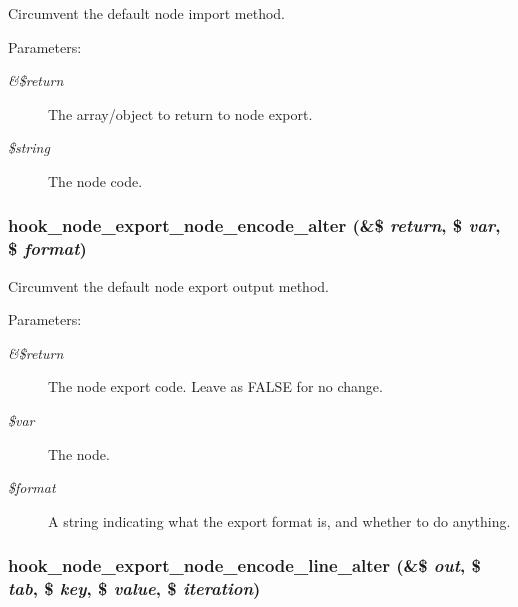 Circumvent the default node import method.

\begin{Desc}
\item[Parameters:]
\begin{description}
\item[{\em \&\$return}]The array/object to return to node export. \item[{\em \$string}]The node code. \end{description}
\end{Desc}
\hypertarget{node__export_8api_8php_aa3a7ad2886990335945a261e9d38793}{
\subsubsection[{hook\_\-node\_\-export\_\-node\_\-encode\_\-alter}]{\setlength{\rightskip}{0pt plus 5cm}hook\_\-node\_\-export\_\-node\_\-encode\_\-alter (\&\$ {\em return}, \/  \$ {\em var}, \/  \$ {\em format})}}
\label{node__export_8api_8php_aa3a7ad2886990335945a261e9d38793}


Circumvent the default node export output method.

\begin{Desc}
\item[Parameters:]
\begin{description}
\item[{\em \&\$return}]The node export code. Leave as FALSE for no change. \item[{\em \$var}]The node. \item[{\em \$format}]A string indicating what the export format is, and whether to do anything. \end{description}
\end{Desc}
\hypertarget{node__export_8api_8php_358549eb1b3bc10229c889721c180a51}{
\subsubsection[{hook\_\-node\_\-export\_\-node\_\-encode\_\-line\_\-alter}]{\setlength{\rightskip}{0pt plus 5cm}hook\_\-node\_\-export\_\-node\_\-encode\_\-line\_\-alter (\&\$ {\em out}, \/  \$ {\em tab}, \/  \$ {\em key}, \/  \$ {\em value}, \/  \$ {\em iteration})}}
\label{node__export_8api_8php_358549eb1b3bc10229c889721c180a51}


